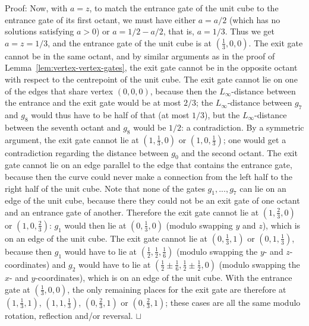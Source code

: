 \documentclass[11pt,a4paper]{article}
\newenvironment{proof}{Proof:}{\qed}
\def\squareforqed{\hbox{\rlap{$\sqcap$}$\sqcup$}}
\def\qed{\ifmmode\squareforqed\else{\unskip\nobreak\hfil
\penalty50\hskip1em\null\nobreak\hfil\squareforqed
\parfillskip=0pt\finalhyphendemerits=0\endgraf}\fi}
\begin{document}
\begin{proof}
Now, with $a = z$, to match the entrance gate of the unit cube to the entrance gate of its first octant, we must have either $a = a/2$ (which has no solutions satisfying $a > 0$) or $a = 1/2 - a/2$, that is, $a = 1/3$. Thus we get $a = z = 1/3$, and the entrance gate of the unit cube is at $(\frac13,0,0)$. The exit gate cannot be in the same octant, and by similar arguments as in the proof of Lemma~\ref{lem:vertex-vertex-gates}, the exit gate cannot be in the opposite octant with respect to the centrepoint of the unit cube. The exit gate cannot lie on one of the edges that share vertex $(0,0,0)$, because then the $L_\infty$-distance between the entrance and the exit gate would be at most $2/3$; the $L_\infty$-distance between $g_7$ and $g_8$ would thus have to be half of that (at most $1/3$), but the $L_\infty$-distance between the seventh octant and $g_8$ would be $1/2$: a contradiction. By a symmetric argument, the exit gate cannot lie at $(1,\frac13,0)$ or $(1,0,\frac13)$; one would get a contradiction regarding the distance between $g_0$ and the second octant. The exit gate cannot lie on an edge parallel to the edge that contains the entrance gate, because then the curve could never make a connection from the left half to the right half of the unit cube. Note that none of the gates $g_1,...,g_7$ can lie on an edge of the unit cube, because there they could not be an exit gate of one octant and an entrance gate of another. Therefore the exit gate cannot lie at $(1,\frac23,0)$ or $(1,0,\frac23)$: $g_1$ would then lie at $(0,\frac13,0)$ (modulo swapping $y$ and $z$), which is on an edge of the unit cube. The exit gate cannot lie at $(0,\frac13,1)$ or $(0,1,\frac13)$, because then $g_1$ would have to lie at $(\frac12,\frac12,\frac16)$ (modulo swapping the $y$- and $z$-coordinates) and $g_2$ would have to lie at $(\frac12\pm\frac16, \frac12\pm\frac12,0)$ (modulo swapping the $x$- and $y$-coordinates), which is on an edge of the unit cube. With the entrance gate at $(\frac13,0,0)$, the only remaining places for the exit gate are therefore at $(1,\frac13,1)$, $(1,1,\frac13)$, $(0,\frac23,1)$ or $(0,\frac23,1)$; these cases are all the same modulo rotation, reflection and/or reversal.
\end{proof}
\end{document}
